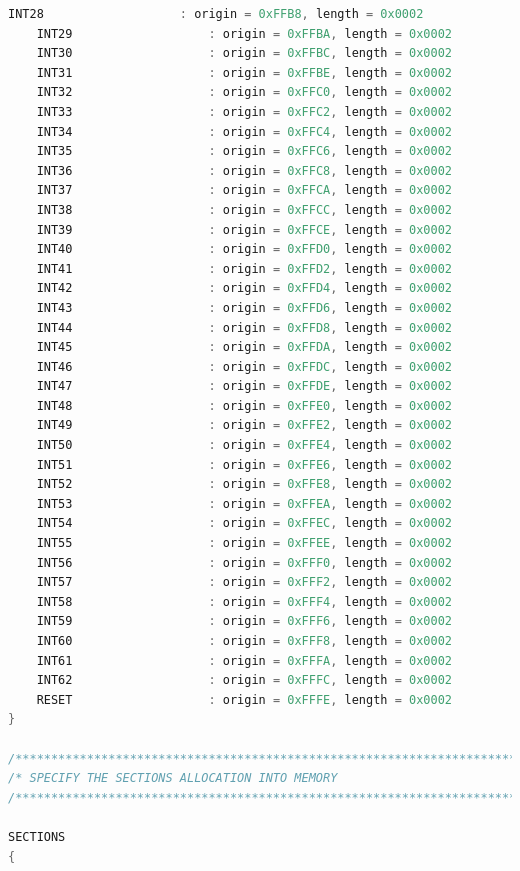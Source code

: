 \documentclass[LaM,binding=0.6cm]{../sapthesis}
\begin{document}
\begin{lstlisting}[language=C]
    INT28                   : origin = 0xFFB8, length = 0x0002
    INT29                   : origin = 0xFFBA, length = 0x0002
    INT30                   : origin = 0xFFBC, length = 0x0002
    INT31                   : origin = 0xFFBE, length = 0x0002
    INT32                   : origin = 0xFFC0, length = 0x0002
    INT33                   : origin = 0xFFC2, length = 0x0002
    INT34                   : origin = 0xFFC4, length = 0x0002
    INT35                   : origin = 0xFFC6, length = 0x0002
    INT36                   : origin = 0xFFC8, length = 0x0002
    INT37                   : origin = 0xFFCA, length = 0x0002
    INT38                   : origin = 0xFFCC, length = 0x0002
    INT39                   : origin = 0xFFCE, length = 0x0002
    INT40                   : origin = 0xFFD0, length = 0x0002
    INT41                   : origin = 0xFFD2, length = 0x0002
    INT42                   : origin = 0xFFD4, length = 0x0002
    INT43                   : origin = 0xFFD6, length = 0x0002
    INT44                   : origin = 0xFFD8, length = 0x0002
    INT45                   : origin = 0xFFDA, length = 0x0002
    INT46                   : origin = 0xFFDC, length = 0x0002
    INT47                   : origin = 0xFFDE, length = 0x0002
    INT48                   : origin = 0xFFE0, length = 0x0002
    INT49                   : origin = 0xFFE2, length = 0x0002
    INT50                   : origin = 0xFFE4, length = 0x0002
    INT51                   : origin = 0xFFE6, length = 0x0002
    INT52                   : origin = 0xFFE8, length = 0x0002
    INT53                   : origin = 0xFFEA, length = 0x0002
    INT54                   : origin = 0xFFEC, length = 0x0002
    INT55                   : origin = 0xFFEE, length = 0x0002
    INT56                   : origin = 0xFFF0, length = 0x0002
    INT57                   : origin = 0xFFF2, length = 0x0002
    INT58                   : origin = 0xFFF4, length = 0x0002
    INT59                   : origin = 0xFFF6, length = 0x0002
    INT60                   : origin = 0xFFF8, length = 0x0002
    INT61                   : origin = 0xFFFA, length = 0x0002
    INT62                   : origin = 0xFFFC, length = 0x0002
    RESET                   : origin = 0xFFFE, length = 0x0002
}

/****************************************************************************/
/* SPECIFY THE SECTIONS ALLOCATION INTO MEMORY                              */
/****************************************************************************/

SECTIONS
{


\end{lstlisting}
\end{document}
